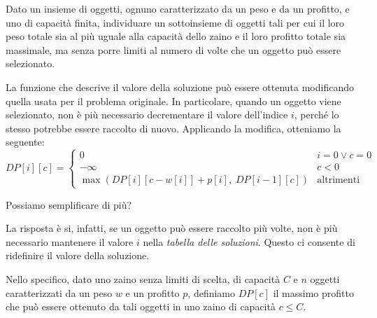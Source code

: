 \begin{problem}
    Dato un insieme di oggetti, ognuno caratterizzato da un peso e da un profitto,
    e uno  di capacità finita, individuare un sottoinsieme di oggetti
    tali per cui il loro peso totale sia al più uguale alla capacità dello zaino
    e il loro profitto totale sia massimale, ma senza porre limiti al numero di
    volte che un oggetto può essere selezionato.
\end{problem}\noindent
La funzione che descrive il valore della soluzione può essere ottenuta modificando
quella usata per il problema originale. In particolare, quando un oggetto viene
selezionato, non è più necessario decrementare il valore dell'indice $i$, perché
lo stesso potrebbe essere raccolto di nuovo. Applicando la modifica, otteniamo la
seguente:
\[DP[i][c]=\begin{cases}
    0 & i=0 \vee c = 0\\
    -\infty & c < 0\\
    \max\left(DP[i][c-w[i]]+p[i],\;DP[i-1][c]\right) & \text{altrimenti}
\end{cases}\]

\bigskip\noindent
Possiamo semplificare di più?

La risposta è si, infatti, se un oggetto può essere raccolto più volte, non
è più necessario mantenere il valore $i$ nella \emph{tabella delle soluzioni}.
Questo ci consente di ridefinire il valore della soluzione.

Nello specifico, dato uno zaino senza limiti di scelta, di capacità $C$ e $n$
oggetti caratterizzati da un peso $w$ e un profitto $p$, definiamo $DP[c]$ il
massimo profitto che può essere ottenuto da tali oggetti in uno zaino di capacità
$c\leq C$.

